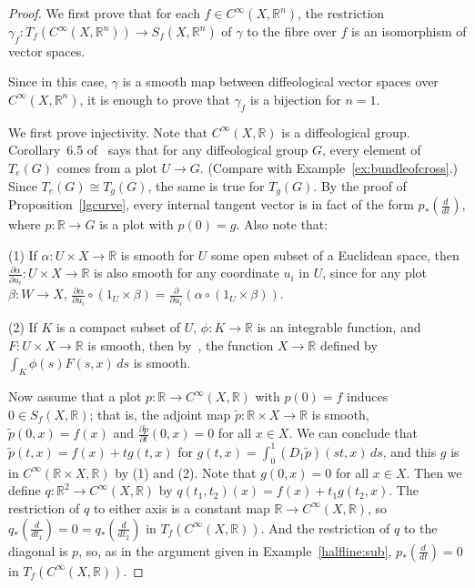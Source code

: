 \documentclass{amsart}
\theoremstyle{remark}
\newcommand{\ra}{\to}
\def \R{\mathbb{R}}
\begin{document}
\begin{proof}
We first prove that for each $f \in C^\infty(X,\R^n)$,
the restriction $\gamma_f:T_f(C^\infty(X,\R^n)) \ra S_f(X,\R^n)$ of $\gamma$
to the fibre over $f$ is an isomorphism of vector spaces.

Since in this case, $\gamma$ is a smooth map between diffeological
vector spaces over $C^\infty(X,\R^n)$,
it is enough to prove that $\gamma_f$ is a bijection for $n=1$.

We first prove injectivity.
Note that $C^\infty(X,\R)$ is a diffeological group.
Corollary~6.5 of~\cite{HM} says that for any diffeological group $G$,
every element of $T_e(G)$ comes from a plot $U \ra G$.
(Compare with Example~\ref{ex:bundleofcross}.)
Since $T_e(G) \cong T_g(G)$, the same is true for $T_g(G)$.
By the proof of Proposition~\ref{lgcurve}, every internal tangent vector
is in fact of the form $p_*(\frac{d}{dt})$, where $p : \R \to G$ is
a plot with $p(0) = g$.
Also note that:

(1) If $\alpha:U \times X \ra \R$ is smooth
for $U$ some open subset of a Euclidean space,
then $\frac{\partial \alpha}{\partial u_i}:U \times X \ra \R$
is also smooth for any coordinate $u_i$ in $U$,
since for any plot $\beta:W \ra X$, $\frac{\partial \alpha}{\partial u_i} \circ (1_U \times \beta)=\frac{\partial}{\partial u_i}(\alpha \circ (1_U \times \beta))$.

(2) If $K$ is a compact subset of $U$,
$\phi:K \ra \R$ is an integrable function,
and $F:U \times X \ra \R$ is smooth,
then by~\cite[Theorem~V.2.9.9]{G},
the function $X \ra \R$ defined by $\int_K \phi(s) F(s,x) \, ds$ is smooth.

Now assume that a plot $p:\R \ra C^\infty(X,\R)$
with $p(0)=f$ induces $0 \in S_f(X,\R)$;
that is, the adjoint map $\tilde{p}:\R \times X \ra \R$ is smooth,
$\tilde{p}(0,x)=f(x)$ and $\frac{\partial \tilde{p}}{\partial t}(0,x)=0$
for all $x \in X$.
We can conclude that $\tilde{p}(t,x)=f(x)+tg(t,x)$
for $g(t,x)=\int_0^1 (D_1 \tilde{p})(st,x) \, ds$,
%
%
and this $g$ is in $C^\infty(\R \times X,\R)$ by (1) and (2).
Note that $g(0,x)=0$ for all $x \in X$.
Then we define $q : \R^2 \ra C^\infty(X,\R)$ by
$q(t_1,t_2)(x) = f(x)+t_1 g(t_2,x)$.
The restriction of $q$ to
either axis is a constant map $\R \ra C^\infty(X,\R)$,
so $q_*(\frac{d}{dt_1}) = 0 = q_*(\frac{d}{dt_2})$ in $T_f(C^\infty(X,\R))$.
And the restriction of $q$ to the diagonal is $p$, so,
as in the argument given in Example~\ref{halfline:sub},
$p_*(\frac{d}{dt}) = 0$ in $T_f(C^\infty(X,\R))$.


\end{proof}
\end{document}
